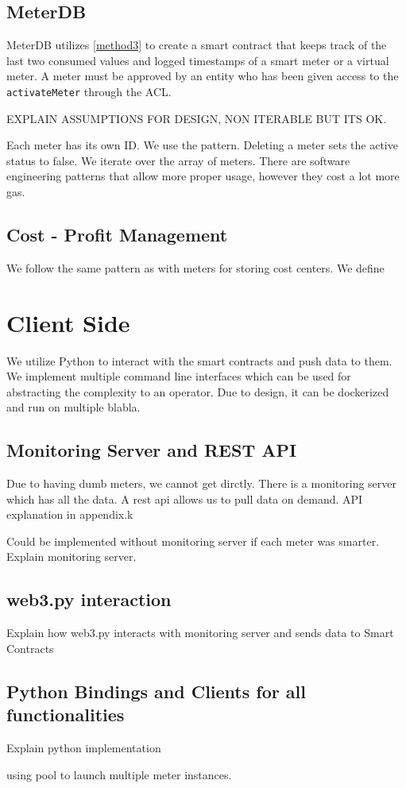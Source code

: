\subsection{MeterDB}
MeterDB utilizes \ref{method3} to create a smart contract that keeps track of the last two consumed values and logged timestamps of a smart meter or a virtual meter. A meter must be approved by an entity who has been given access to the \texttt{activateMeter} through the ACL. 

EXPLAIN ASSUMPTIONS FOR DESIGN, NON ITERABLE BUT ITS OK. 

Each meter has its own ID. We use the pattern. Deleting a meter sets the active status to false. We iterate over the array of meters. There are software engineering patterns \cite{crud} that allow more proper usage, however they cost a lot more gas. 


\subsection{Cost - Profit Management}
We follow the same pattern as with meters for storing cost centers. We define 

\section{Client Side}

We utilize Python to interact with the smart contracts and push data to them. We implement multiple command line interfaces which can be used for abstracting the complexity to an operator. Due to design, it can be dockerized and run on multiple blabla.

\subsection{Monitoring Server and REST API}
Due to having dumb meters, we cannot get dirctly. There is a monitoring server which has all the data. A rest api allows us to pull data on demand. API explanation in appendix.k

Could be implemented without monitoring server if each meter was smarter. 
Explain monitoring server.

\subsection{web3.py interaction}
Explain how web3.py interacts with monitoring server and sends data to Smart Contracts

\subsection{Python Bindings and Clients for all functionalities}
Explain python implementation

using pool to launch multiple meter instances.



